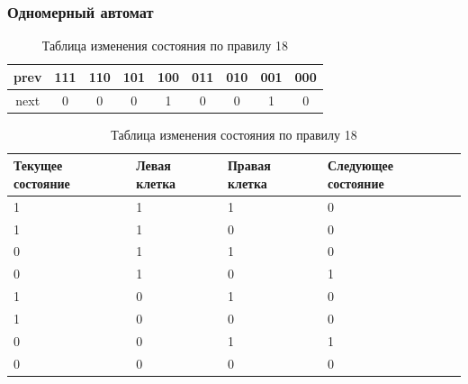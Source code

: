 \documentclass{beamer}
\begin{document}
    \begin{frame}
        \frametitle{Одномерный автомат}
        \begin{table}
            \begin{center}
                \begin{tabular}{ccccccccc}
                    prev & 111 & 110 & 101 & 100 & 011 & 010 & 001 & 000\\
                    \hline
                    next &  0  &  0  &  0  &  1  &  0  &  0  &  1  &  0
                \end{tabular}
            \end{center}
            \caption{Таблица изменения состояния по правилу 18}
            \label{tab:rule18}
        \end{table}

        \begin{table}
            \begin{center}
                \begin{tabular}{|p{2cm}|p{2cm}|p{2cm}|p{2cm}|}
                    \hline
                    Текущее состояние & Левая клетка & Правая клетка & Следующее состояние\\
                    \hline
                    1  &  1  &  1  &  0\\
                    \hline
                    1  &  1  &  0  &  0\\
                    \hline
                    0  &  1  &  1  &  0\\
                    \hline
                    0  &  1  &  0  &  1\\
                    \hline
                    1  &  0  &  1  &  0\\
                    \hline
                    1  &  0  &  0  &  0\\
                    \hline
                    0  &  0  &  1  &  1\\
                    \hline
                    0  &  0  &  0  &  0\\
                    \hline
                \end{tabular}
            \end{center}
            \caption{Таблица изменения состояния по правилу 18}
            \label{tab:rule18logic}
        \end{table}
    \end{frame}
\end{document}
